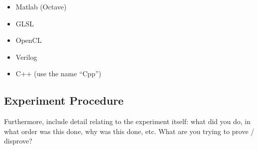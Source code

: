 \begin{itemize}
 \item Matlab (Octave)
 \item GLSL
 \item OpenCL
 \item Verilog
 \item C++ (use the name ``Cpp'')
\end{itemize}
  
\subsection{Experiment Procedure}
Furthermore, include detail relating to the experiment itself: what did you do, in what order was this done, why was this done, etc.  What are you trying to prove / disprove?